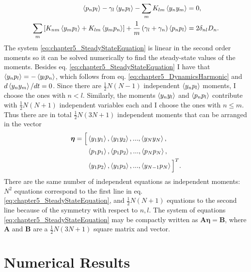 %
\begin{equation}
    \begin{split}
        \expval{p_n p_l} - \gamma_l\expval{y_n p_l} - \sum_m K_{lm}\expval{y_n y_m} &= 0,\\
        \sum_{m}\left[ K_{nm}\expval{y_m p_l} + K_{lm}\expval{y_m p_n} \right] + \frac{1}{m}\left( \gamma_l + \gamma_n \right)\expval{p_n p_l} &= 2 \delta_{nl} D_n.
    \end{split}
    \label{eq:chapter5_SteadyStateEquation}
\end{equation}
%
The system \eqref{eq:chapter5_SteadyStateEquation} is linear in the second order moments so it can be solved numerically to find the steady-state values of the moments. Besides eq. \eqref{eq:chapter5_SteadyStateEquation} I have that $\expval{y_n p_l} = - \expval{y_l p_n}$, which follows from eq. \eqref{eq:chapter5_DynamicsHarmonic} and $d\expval{y_n y_m}/dt = 0$. Since there are $\frac{1}{2}N(N-1)$ independent $\expval{y_n p_l}$ moments, I choose the ones with $n<l$. Similarly, the moments $\expval{y_n y_l}$ and $\expval{p_n p_l}$ contribute with $\frac{1}{2}N(N+1)$ independent variables each and I choose the ones with $n\leq m$. Thus there are in total $\frac{1}{2}N(3N+1)$ independent moments that can be arranged in the vector
%
\begin{equation}
\begin{split}
    \bm\eta = \Big[ &\expval{y_1 y_1},\expval{y_1 y_2},...,\expval{y_N y_N},\\
    &\expval{p_1 p_1},\expval{p_1 p_2},...,\expval{p_N p_N},\\
    &\expval{y_1 p_2},\expval{y_1 p_3},...,\expval{y_{N-1} p_N}\Big]^T.
    \label{eq:chapter5_CovariancesVector}
\end{split}
\end{equation}
%
There are the same number of independent equations
as independent moments: $N^2$
equations correspond to the first line in eq.  \eqref{eq:chapter5_SteadyStateEquation}, and $\frac{1}{2}N(N+1)$ equations
to the second line because of the symmetry with respect to $n,l$. The system of equations \eqref{eq:chapter5_SteadyStateEquation} may be compactly written as $\mathbf{A}\boldsymbol\eta = \mathbf{B}$, where $\mathbf{A}$ and $\mathbf{B}$ are a $\frac{1}{2}N(3N+1)$ square matrix and vector.

\section{Numerical Results\label{sec:chapter5_NumericalResults}}


